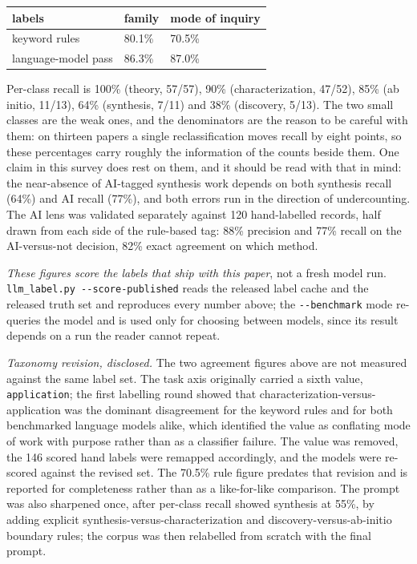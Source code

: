 \documentclass[
  11pt,
]{article}
\newcounter{none} %
\begin{document}
{\def\LTcaptype{none} %
\begin{longtable}[]{@{}lll@{}}
\toprule\noalign{}
labels & family & mode of inquiry \\
\midrule\noalign{}
\endhead
\bottomrule\noalign{}
\endlastfoot
keyword rules & 80.1\% & 70.5\% \\
language-model pass & 86.3\% & 87.0\% \\
\end{longtable}
}

Per-class recall is 100\% (theory, 57/57), 90\% (characterization,
47/52), 85\% (ab initio, 11/13), 64\% (synthesis, 7/11) and 38\%
(discovery, 5/13). The two small classes are the weak ones, and the
denominators are the reason to be careful with them: on thirteen papers
a single reclassification moves recall by eight points, so these
percentages carry roughly the information of the counts beside them. One
claim in this survey does rest on them, and it should be read with that
in mind: the near-absence of AI-tagged synthesis work depends on both
synthesis recall (64\%) and AI recall (77\%), and both errors run in the
direction of undercounting. The AI lens was validated separately against
120 hand-labelled records, half drawn from each side of the rule-based
tag: 88\% precision and 77\% recall on the AI-versus-not decision, 82\%
exact agreement on which method.

\emph{These figures score the labels that ship with this paper}, not a
fresh model run. \texttt{llm\_label.py\ -\/-score-published} reads the
released label cache and the released truth set and reproduces every
number above; the \texttt{-\/-benchmark} mode re-queries the model and
is used only for choosing between models, since its result depends on a
run the reader cannot repeat.

\emph{Taxonomy revision, disclosed.} The two agreement figures above are
not measured against the same label set. The task axis originally
carried a sixth value, \texttt{application}; the first labelling round
showed that characterization-versus- application was the dominant
disagreement for the keyword rules and for both benchmarked language
models alike, which identified the value as conflating mode of work with
purpose rather than as a classifier failure. The value was removed, the
146 scored hand labels were remapped accordingly, and the models were
re-scored against the revised set. The 70.5\% rule figure predates that
revision and is reported for completeness rather than as a like-for-like
comparison. The prompt was also sharpened once, after per-class recall
showed synthesis at 55\%, by adding explicit
synthesis-versus-characterization and discovery-versus-ab-initio
boundary rules; the corpus was then relabelled from scratch with the
final prompt.
\end{document}
